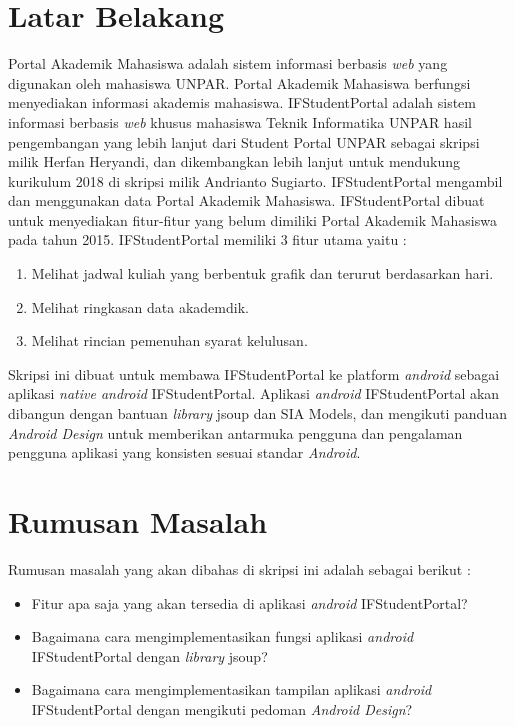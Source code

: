 \documentclass[a4paper,twoside]{article}
\begin{document}
\section{Latar Belakang}
Portal Akademik Mahasiswa adalah sistem informasi berbasis \textit{web} yang digunakan oleh mahasiswa UNPAR. Portal Akademik Mahasiswa berfungsi menyediakan informasi akademis mahasiswa. IFStudentPortal adalah sistem informasi berbasis \textit{web} khusus mahasiswa Teknik Informatika UNPAR hasil pengembangan yang lebih lanjut dari Student Portal UNPAR sebagai skripsi milik Herfan Heryandi, dan dikembangkan lebih lanjut untuk mendukung kurikulum 2018 di skripsi milik Andrianto Sugiarto. IFStudentPortal mengambil dan menggunakan data Portal Akademik Mahasiswa. IFStudentPortal dibuat untuk menyediakan fitur-fitur yang belum dimiliki Portal Akademik Mahasiswa pada tahun 2015. IFStudentPortal memiliki 3 fitur utama yaitu :
\begin{enumerate}
    \item Melihat jadwal kuliah yang berbentuk grafik dan terurut berdasarkan hari.
    \item Melihat ringkasan data akademdik. 
    \item Melihat rincian pemenuhan syarat kelulusan.
\end{enumerate}
Skripsi ini dibuat untuk membawa IFStudentPortal ke platform \textit{android} sebagai aplikasi \textit{native android} IFStudentPortal. Aplikasi \textit{android} IFStudentPortal akan dibangun dengan bantuan \textit{library} jsoup dan SIA Models, dan mengikuti panduan \textit{Android Design} untuk memberikan antarmuka pengguna dan pengalaman pengguna aplikasi yang konsisten sesuai standar \textit{Android}.
\section{Rumusan Masalah}
Rumusan masalah yang akan dibahas di skripsi ini adalah sebagai berikut :
\begin{itemize}
    \item Fitur apa saja yang akan tersedia di aplikasi \textit{android} IFStudentPortal?
    \item Bagaimana cara mengimplementasikan fungsi aplikasi \textit{android} IFStudentPortal dengan \textit{library} jsoup?
    \item Bagaimana cara mengimplementasikan tampilan aplikasi \textit{android} IFStudentPortal dengan mengikuti pedoman \textit{Android Design}?
\end{itemize}
\end{document}
